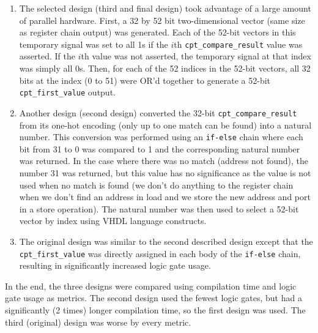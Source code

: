 \documentclass{article}
\begin{document}
\begin{enumerate}
\item
The selected design (third and final design) took advantage of a large amount of parallel hardware. First, a 32 by 52 bit two-dimensional vector (same size as register chain output) was generated. Each of the 52-bit vectors in this temporary signal was set to all 1s if the $i$th \texttt{cpt\_compare\_result} value was asserted. If the $i$th value was not asserted, the temporary signal at that index was simply all 0s. Then, for each of the 52 indices in the 52-bit vectors, all 32 bits at the index (0 to 51) were OR'd together to generate a 52-bit \texttt{cpt\_first\_value} output. 
\item
Another design (second design) converted the 32-bit \texttt{cpt\_compare\_result} from its one-hot encoding (only up to one match can be found) into a natural number. This conversion was performed using an \texttt{if-else} chain where each bit from 31 to 0 was compared to 1 and the corresponding natural number was returned. In the case where there was no match (address not found), the number 31 was returned, but this value has no significance as the value is not used when no match is found (we don't do anything to the register chain when we don't find an address in load and we store the new address and port in a store operation). The natural number was then used to select a 52-bit vector by index using VHDL language constructs. 
\item
The original design was similar to the second described design except that the \texttt{cpt\_first\_value} was directly assigned in each body of the \texttt{if-else} chain, resulting in significantly increased logic gate usage. 
\end{enumerate}

In the end, the three designs were compared using compilation time and logic gate usage as metrics. The second design used the fewest logic gates, but had a significantly (2 times) longer compilation time, so the first design was used. The third (original) design was worse by every metric. 
\end{document}
